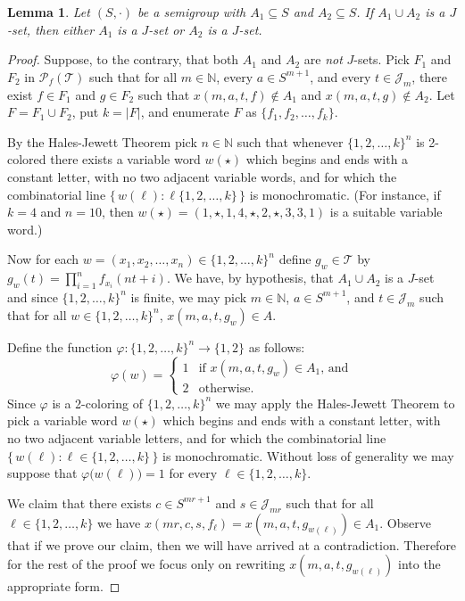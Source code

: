 \documentclass[12pt]{article}
\theoremstyle{plain}
\newtheorem{lem}[thm]{Lemma}
\theoremstyle{definition}
\newcommand{\bbN}{\mathbb{N}}
\newcommand{\calJ}{\mathcal{J}}
\newcommand{\calT}{\mathcal{T}}
\newcommand{\Pf}{\mathcal{P}_f}
\begin{document}
\begin{lem}
  \label{lem:pr-jsets}
  Let $(S, \cdot)$ be a semigroup with $A_1 \subseteq S$ and $A_2 \subseteq S$.
  If $A_1 \cup A_2$ is a $J$-set, then either $A_1$ is a $J$-set or $A_2$ is a $J$-set.
\end{lem}
\begin{proof}
  Suppose, to the contrary, that both $A_1$ and $A_2$ are \textsl{not} $J$-sets.
  Pick $F_1$ and $F_2$ in $\Pf(\calT)$ such that for all $m \in \bbN$, every $a \in S^{m+1}$, and every $t \in \calJ_m$, there exist $f \in F_1$ and $g \in F_2$ such that $x(m, a, t, f) \not\in A_1$ and $x(m, a, t, g) \not\in A_2$.
  Let $F = F_1 \cup F_2$, put $k = |F|$, and enumerate $F$ as $\{f_1, f_2, \ldots, f_k\}$.

  By the Hales-Jewett Theorem pick $n \in \bbN$ such that whenever $\{1, 2, \ldots, k\}^n$ is 2-colored there exists a variable word $w(\star)$ which begins and ends with a constant letter, with no two adjacent variable words, and for which the combinatorial line $\bigl\{\, w(\ell) : \ell \{1, 2, \ldots, k\} \,\bigr\}$ is monochromatic. 
  (For instance, if $k = 4$ and $n = 10$, then $w(\star) = (1, \star, 1, 4, \star, 2, \star, 3, 3, 1)$ is a suitable variable word.)

  Now for each $w = (x_1, x_2, \ldots, x_n) \in \{1, 2, \ldots, k\}^n$ define $g_w \in \calT$ by $g_w(t) = \prod_{i=1}^n f_{x_i}(nt + i)$.
  We have, by hypothesis, that $A_1 \cup A_2$ is a $J$-set and since $\{1, 2, \ldots, k\}^n$ is finite, we may pick $m \in \bbN$, $a \in S^{m+1}$, and $t \in \calJ_m$ such that for all $w \in \{1, 2, \ldots, k\}^n$, $x(m, a, t, g_w) \in A$.

  Define the function $\varphi \colon \{1, 2, \ldots, k\}^n \to \{1, 2\}$ as follows:
  \[
    \varphi(w) = 
    \begin{cases}
      1 & \mbox{if $x(m, a, t, g_w) \in A_1$, and} \\
      2 & \mbox{otherwise.}
    \end{cases}
  \]
  Since $\varphi$ is a 2-coloring of $\{1, 2, \ldots, k\}^n$ we may apply the Hales-Jewett Theorem to pick a variable word $w(\star)$ which begins and ends with a constant letter, with no two adjacent variable letters, and for which the combinatorial line $\bigl\{\, w(\ell) : \ell \in \{1, 2, \ldots, k\} \,\bigr\}$ is monochromatic. 
  Without loss of generality we may suppose that $\varphi \bigl( w(\ell) \bigr) = 1$ for every $\ell \in \{1, 2, \ldots, k\}$.

  We claim that there exists $c \in S^{mr+1}$ and $s \in \calJ_{mr}$ such that for all $\ell \in \{1, 2, \ldots, k\}$ we have $x(mr, c, s, f_\ell) = x(m, a, t, g_{w(\ell)}) \in A_1$. 
  Observe that if we prove our claim, then we will have arrived at a contradiction. 
  Therefore for the rest of the proof we focus only on rewriting $x(m, a, t, g_{w(\ell)})$ into the appropriate form.


\end{proof}
\end{document}

